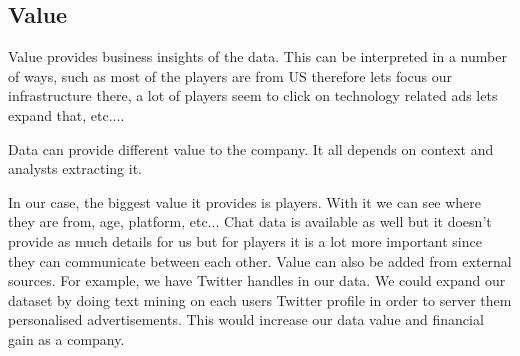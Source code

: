 \subsection{Value}\label{Value}

Value provides business insights of the data. This can be interpreted in a number of ways, such as most of the players are from US therefore lets focus our infrastructure there, a lot of players seem to click on technology related ads lets expand that, etc....

Data can provide different value to the company. It all depends on context and analysts extracting it.

In our case, the biggest value it provides is players. With it we can see where they are from, age, platform, etc... Chat data is available as well but it doesn't provide as much details for us but for players it is a lot more important since they can communicate between each other.
Value can also be added from external sources. For example, we have Twitter handles in our data. We could expand our dataset by doing text mining on each users Twitter profile in order to server them personalised advertisements. This would increase our data value and financial gain as a company.